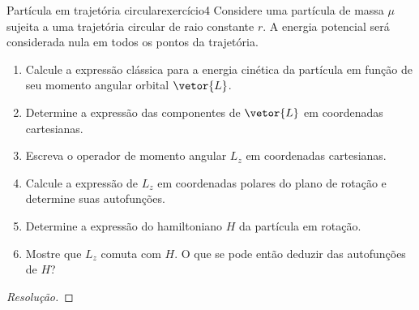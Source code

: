 \begin{exercício}{Partícula em trajetória circular}{exercício4}
    Considere uma partícula de massa \(\mu\) sujeita a uma trajetória circular de raio constante \(r\). A energia potencial será considerada nula em todos os pontos da trajetória.
    \begin{enumerate}[label=(\alph*)]
        \item Calcule a expressão clássica para a energia cinética da partícula em função de seu momento angular orbital \(\vetor{L}\).
        \item Determine a expressão das componentes de \(\vetor{L}\) em coordenadas cartesianas.
        \item Escreva o operador de momento angular \(L_z\) em coordenadas cartesianas.
        \item Calcule a expressão de \(L_z\) em coordenadas polares do plano de rotação e determine suas autofunções.
        \item Determine a expressão do hamiltoniano \(H\) da partícula em rotação.
        \item Mostre que \(L_z\) comuta com \(H\). O que se pode então deduzir das autofunções de \(H\)?
    \end{enumerate}
\end{exercício}
\begin{proof}[Resolução]

\end{proof}
